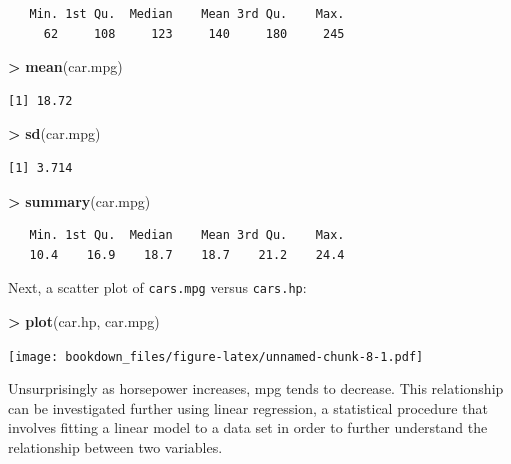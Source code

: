 \documentclass[
]{krantz}
\makeatletter
\newenvironment{Shaded}{\begin{snugshade}}{\end{snugshade}}
\newcommand{\KeywordTok}[1]{\textcolor[rgb]{0.27,0.27,0.27}{\textbf{#1}}}
\newcommand{\NormalTok}[1]{#1}
\newcommand{\OperatorTok}[1]{\textcolor[rgb]{0.43,0.43,0.43}{\textbf{#1}}}
\newcommand{\StringTok}[1]{\textcolor[rgb]{0.5,0.5,0.5}{#1}}
\newenvironment{kframe}{%
\medskip{}
\setlength{\fboxsep}{.8em}
 \def\at@end@of@kframe{}%
 \ifinner\ifhmode%
  \def\at@end@of@kframe{\end{minipage}}%
  \begin{minipage}{\columnwidth}%
 \fi\fi%
 \def\FrameCommand##1{\hskip\@totalleftmargin \hskip-\fboxsep
 \colorbox{shadecolor}{##1}\hskip-\fboxsep
     \hskip-\linewidth \hskip-\@totalleftmargin \hskip\columnwidth}%
 \MakeFramed {\advance\hsize-\width
   \@totalleftmargin\z@ \linewidth\hsize
   \@setminipage}}%
 {\par\unskip\endMakeFramed%
 \at@end@of@kframe}
\renewenvironment{Shaded}{\begin{kframe}}{\end{kframe}}
\makeatother
\begin{document}
\begin{verbatim}
   Min. 1st Qu.  Median    Mean 3rd Qu.    Max. 
     62     108     123     140     180     245 
\end{verbatim}

\begin{Shaded}
\begin{Highlighting}[]
\OperatorTok{\textgreater{}}\StringTok{ }\KeywordTok{mean}\NormalTok{(car.mpg)}
\end{Highlighting}
\end{Shaded}

\begin{verbatim}
[1] 18.72
\end{verbatim}

\begin{Shaded}
\begin{Highlighting}[]
\OperatorTok{\textgreater{}}\StringTok{ }\KeywordTok{sd}\NormalTok{(car.mpg)}
\end{Highlighting}
\end{Shaded}

\begin{verbatim}
[1] 3.714
\end{verbatim}

\begin{Shaded}
\begin{Highlighting}[]
\OperatorTok{\textgreater{}}\StringTok{ }\KeywordTok{summary}\NormalTok{(car.mpg)}
\end{Highlighting}
\end{Shaded}

\begin{verbatim}
   Min. 1st Qu.  Median    Mean 3rd Qu.    Max. 
   10.4    16.9    18.7    18.7    21.2    24.4 
\end{verbatim}

Next, a scatter plot of \texttt{cars.mpg} versus \texttt{cars.hp}:

\begin{Shaded}
\begin{Highlighting}[]
\OperatorTok{\textgreater{}}\StringTok{ }\KeywordTok{plot}\NormalTok{(car.hp, car.mpg)}
\end{Highlighting}
\end{Shaded}

\texttt{[image: bookdown\_files/figure-latex/unnamed-chunk-8-1.pdf]}

Unsurprisingly as horsepower increases, mpg tends to decrease. This relationship can be investigated further using linear regression, a statistical procedure that involves fitting a linear model to a data set in order to further understand the relationship between two variables.
\end{document}
